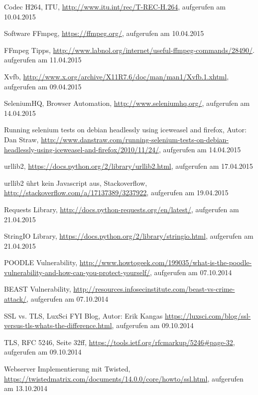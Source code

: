 \begin{thebibliography}{x}
   Codec H264, ITU, \url{http://www.itu.int/rec/T-REC-H.264}, aufgerufen am 10.04.2015
  
   Software FFmpeg, \url{https://ffmpeg.org/}, aufgerufen am 10.04.2015
  
   FFmpeg Tipps, \url{http://www.labnol.org/internet/useful-ffmpeg-commands/28490/}. aufgerufen am 11.04.2015
  
   Xvfb, \url{http://www.x.org/archive/X11R7.6/doc/man/man1/Xvfb.1.xhtml}, aufgerufen am 09.04.2015
  
   SeleniumHQ, Browser Automation, \url{http://www.seleniumhq.org/}, aufgerufen am 14.04.2015
  
   Running selenium tests on debian headlessly using iceweasel and firefox, Autor: Dan Straw, \url{http://www.danstraw.com/running-selenium-tests-on-debian-headlessly-using-iceweasel-and-firefox/2010/11/24/}, aufgerufen am 14.04.2015
  
   urllib2, \url{https://docs.python.org/2/library/urllib2.html}, aufgerufen am 17.04.2015
  
   urllib2 ührt kein Javascript aus, Stackoverflow, \url{http://stackoverflow.com/a/17137389/3237922}, aufgerufen am 19.04.2015
  
   Requests Library, \url{http://docs.python-requests.org/en/latest/}, aufgerufen am 21.04.2015
  
   StringIO Library, \url{https://docs.python.org/2/library/stringio.html}, aufgerufen am 21.04.2015
  
   POODLE Vulnerability, \url{http://www.howtogeek.com/199035/what-is-the-poodle-vulnerability-and-how-can-you-protect-yourself/}, aufgerufen am 07.10.2014
  
   BEAST Vulnerability, \url{http://resources.infosecinstitute.com/beast-vs-crime-attack/}, aufgerufen am 07.10.2014
  
   SSL vs. TLS, LuxSci FYI Blog, 
  Autor: Erik Kangas \url{https://luxsci.com/blog/ssl-versus-tls-whats-the-difference.html}, aufgerufen am 09.10.2014
  
   TLS, RFC 5246, Seite 32ff, \url{https://tools.ietf.org/rfcmarkup/5246#page-32}, aufgerufen am 09.10.2014
  
   Webserver Implementierung mit Twisted, \url{https://twistedmatrix.com/documents/14.0.0/core/howto/ssl.html}, aufgerufen am 13.10.2014
  

\end{thebibliography}
